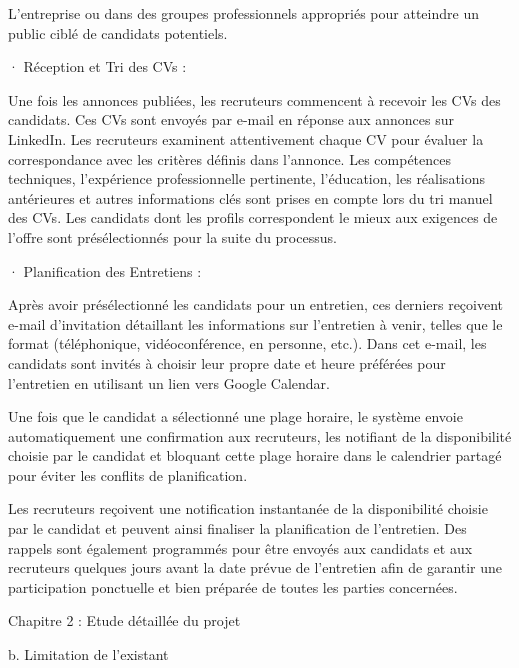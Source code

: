 L’entreprise ou dans des groupes professionnels appropriés pour atteindre un public ciblé de candidats potentiels.

· Réception et Tri des CVs :

Une fois les annonces publiées, les recruteurs commencent à recevoir les CVs des candidats. Ces CVs sont envoyés par e-mail en réponse aux annonces sur LinkedIn. Les recruteurs examinent attentivement chaque CV pour évaluer la correspondance avec les critères définis dans l'annonce. Les compétences techniques, l'expérience professionnelle pertinente, l'éducation, les réalisations antérieures et autres informations clés sont prises en compte lors du tri manuel des CVs. Les candidats dont les profils correspondent le mieux aux exigences de l'offre sont présélectionnés pour la suite du processus.

· Planification des Entretiens :

Après avoir présélectionné les candidats pour un entretien, ces derniers reçoivent e-mail d'invitation détaillant les informations sur l'entretien à venir, telles que le format (téléphonique, vidéoconférence, en personne, etc.). Dans cet e-mail, les candidats sont invités à choisir leur propre date et heure préférées pour l'entretien en utilisant un lien vers Google Calendar.

Une fois que le candidat a sélectionné une plage horaire, le système envoie automatiquement une confirmation aux recruteurs, les notifiant de la disponibilité choisie par le candidat et bloquant cette plage horaire dans le calendrier partagé pour éviter les conflits de planification.

Les recruteurs reçoivent une notification instantanée de la disponibilité choisie par le candidat et peuvent ainsi finaliser la planification de l'entretien. Des rappels sont également programmés pour être envoyés aux candidats et aux recruteurs quelques jours avant la date prévue de l'entretien afin de garantir une participation ponctuelle et bien préparée de toutes les parties concernées.

Chapitre 2 : Etude détaillée du projet

b. Limitation de l’existant

